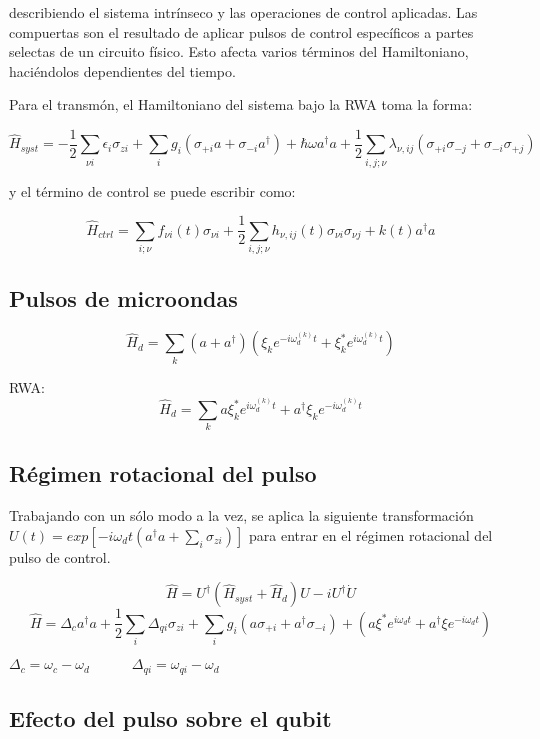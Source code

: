 describiendo el sistema intrínseco y las operaciones de control aplicadas. Las compuertas son el resultado de aplicar pulsos de control específicos a partes selectas de un circuito físico. Esto afecta varios términos del Hamiltoniano, haciéndolos dependientes del tiempo.

Para el transmón, el Hamiltoniano del sistema bajo la RWA toma la forma:

\[
\hat{H}_{syst} = -\frac{1}{2} \sum\limits_{\nu i} \epsilon_i \sigma_{z i} + \sum\limits_{i} g_i (\sigma_{+ i} a + \sigma_{- i} a^\dag) + \hbar \omega a^\dag a + \frac{1}{2} \sum\limits_{i,j;\nu} \lambda_{\nu, ij} (\sigma_{+ i} \sigma_{- j} + \sigma_{- i} \sigma_{+ j})
\]

y el término de control se puede escribir como:

\[
\hat{H}_{ctrl} = \sum\limits_{i; \nu} f_{\nu i}(t) \sigma_{\nu i} + \frac{1}{2} \sum\limits_{i,j;\nu} h_{\nu, ij}(t) \sigma_{\nu i} \sigma_{\nu j} + k(t) a^\dag a
\]

\subsection{Pulsos de microondas}

$$\hat{H}_d = \sum\limits_k (a+a^\dagger) (\xi_k e^{-i\omega_d^{(k)}t} + \xi_k^*e^{i\omega_d^{(k)}t})$$

RWA: $$\hat{H}_d=\sum\limits_k a\xi_k^*e^{i\omega_d^{(k)}t}+ a^\dagger\xi_ke^{-i\omega_d^{(k)}t}$$

\subsection{Régimen rotacional del pulso}

Trabajando con un sólo modo a la vez, se aplica la siguiente transformación $U(t) = exp[-i \omega_d t(a^\dagger a + \sum\limits_i \sigma_{z i})]$ para entrar en el régimen rotacional del pulso de control.

$$\hat{H} = U^\dagger (\hat{H}_{syst} + \hat{H}_d) U - i U^\dagger \dot{U}$$
$$ \hat{H} = \Delta_c a^\dagger a + \frac{1}{2} \sum\limits_i \Delta_{qi} \sigma_{zi} + \sum\limits_i g_i (a \sigma_{+ i} + a^\dagger \sigma_{- i}) + (a\xi^*e^{i\omega_d t}+a^\dagger\xi e^{-i\omega_d t})$$

$\Delta_c = \omega_c - \omega_d \qquad \quad \Delta_{qi} = \omega_{qi} - \omega_d$

\subsection{Efecto del pulso sobre el qubit}

